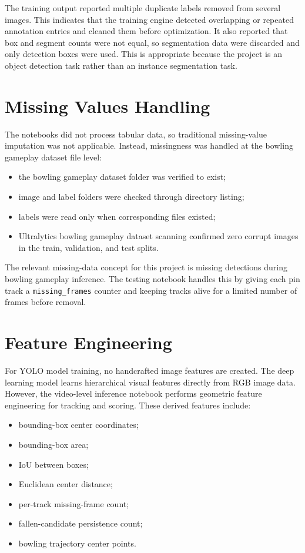 \documentclass[12pt,a4paper]{article}
\begin{document}
The training output reported multiple duplicate labels removed from several images. This indicates that the training engine detected overlapping or repeated annotation entries and cleaned them before optimization. It also reported that box and segment counts were not equal, so segmentation data were discarded and only detection boxes were used. This is appropriate because the project is an object detection task rather than an instance segmentation task.

\section{Missing Values Handling}

The notebooks did not process tabular data, so traditional missing-value imputation was not applicable. Instead, missingness was handled at the bowling gameplay dataset file level:
\begin{itemize}[noitemsep]
    \item the bowling gameplay dataset folder was verified to exist;
    \item image and label folders were checked through directory listing;
    \item labels were read only when corresponding files existed;
    \item Ultralytics bowling gameplay dataset scanning confirmed zero corrupt images in the train, validation, and test splits.
\end{itemize}

The relevant missing-data concept for this project is missing detections during bowling gameplay inference. The testing notebook handles this by giving each pin track a \texttt{missing\_frames} counter and keeping tracks alive for a limited number of frames before removal.

\section{Feature Engineering}

For YOLO model training, no handcrafted image features are created. The deep learning model learns hierarchical visual features directly from RGB image data. However, the video-level inference notebook performs geometric feature engineering for tracking and scoring. These derived features include:
\begin{itemize}[noitemsep]
    \item bounding-box center coordinates;
    \item bounding-box area;
    \item IoU between boxes;
    \item Euclidean center distance;
    \item per-track missing-frame count;
    \item fallen-candidate persistence count;
    \item bowling trajectory center points.
\end{itemize}
\end{document}

